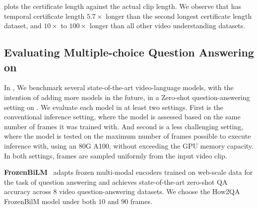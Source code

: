  plots the certificate length against the actual clip length. We observe that \name{}{} has temporal certificate length $5.7\times$ longer than the second longest certificate length dataset, and $10\times$ to $100\times$ longer than all other video understanding datasets.

\subsection{Evaluating Multiple-choice Question Answering on\name{}{}}
\label{sec:eval_mcq}

In , We benchmark several state-of-the-art video-language models, with the intention of adding more models in the future, in a Zero-shot question-answering setting on \name{}{}. We evaluate each model in at least two settings. First is the conventional inference setting, where the model is assessed based on the same number of frames it was trained with. And second is a less challenging setting, where the model is tested on the maximum number of frames possible to execute inference with, using an 80G A100, without exceeding the GPU memory capacity. In both settings, frames are sampled uniformly from the input video clip.

\noindent\textbf{FrozenBiLM}~\cite{bilm} adapts frozen multi-modal encoders trained on web-scale data for the task of question answering and achieves state-of-the-art zero-shot QA accuracy across $8$ video question-answering datasets. We choose the How2QA FrozenBilM model under both $10$ and $90$ frames.

